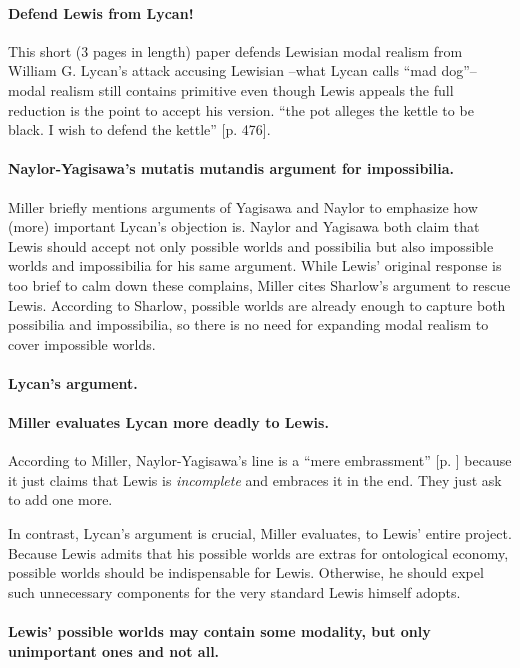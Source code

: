 \documentclass[
10pt, %
a4paper, %
twocolumn, %
landscape %
]{article}
\begin{document}
\paragraph{Defend Lewis from Lycan!}
This short (3 pages in length) paper defends Lewisian modal realism from William G. Lycan's attack accusing Lewisian --what Lycan calls ``mad dog''-- modal realism still contains primitive even though Lewis appeals the full reduction is the point to accept his version.
``the pot alleges the kettle to be black. I wish to defend the kettle'' [p. 476].

\paragraph{Naylor-Yagisawa's mutatis mutandis argument for impossibilia.}
Miller briefly mentions arguments of Yagisawa and Naylor to emphasize how (more) important Lycan's objection is.
Naylor and Yagisawa both claim that Lewis should accept not only possible worlds and possibilia but also impossible worlds and impossibilia for his same argument.
While Lewis' original response is too brief to calm down these complains, Miller cites Sharlow's argument to rescue Lewis.
According to Sharlow, possible worlds are already enough to capture both possibilia and impossibilia, so there is no need for expanding modal realism to cover impossible worlds.

\paragraph{Lycan's argument.}

\paragraph{Miller evaluates Lycan more deadly to Lewis.}
According to Miller, Naylor-Yagisawa's line is a ``mere embrassment'' [p. ] because it just claims that Lewis is \emph{incomplete} and embraces it in the end. They just ask to add one more.

In contrast, Lycan's argument is crucial, Miller evaluates, to Lewis' entire project.
Because Lewis admits that his possible worlds are extras for ontological economy, possible worlds should be indispensable for Lewis. Otherwise, he should expel such unnecessary components for the very standard Lewis himself adopts.

\paragraph{Lewis' possible worlds may contain some modality, but only unimportant ones and not all.}
\end{document}
